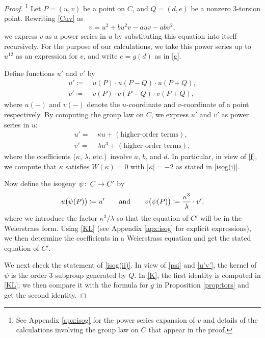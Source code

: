 \documentclass{gtpart}
\theoremstyle{definition}
\theoremstyle{remark}
\def\co{\colon\thinspace}
\newcommand{\ad}{{\rm and}}
\newcommand{\K}{\kappa}
\begin{document}
\begin{proof}
 \footnote{See Appendix \ref{apx:isog} for the power series expansion of 
 $v$ and details of the calculations involving the group law on $C$ that 
 appear in the proof.  }
 Let $P = (u,v)$ be a point on $C$, and $Q = (d,e)$ be a nonzero 
 3-torsion point.  Rewriting \eqref{Cuv} as 
 \[
  v = u^3 + b u^2 v - a u v - a b v^2, 
 \]
 we express $v$ as a power series in $u$ by substituting this equation 
 into itself recursively.  For the purpose of our calculations, we take 
 this power series up to $u^{12}$ as an expression for $v$, and write 
 $e = g(d)$ as in \eqref{g}.  

 Define functions $u'$ and $v'$ by 
 \begin{equation}
 \label{u'v'}
 \begin{split}
  u' \coloneqq & ~ u(P) \cdot u(P-Q) \cdot u(P+Q), \\
  v' \coloneqq & ~ v(P) \cdot v(P-Q) \cdot v(P+Q), 
 \end{split}
 \end{equation}
 where $u(-)$ and $v(-)$ denote the $u$-coordinate and $v$-coordinate of 
 a point respectively.  By computing the group law on $C$, we express 
 $u'$ and $v'$ as power series in $u$: 
 \begin{equation}
 \label{KL}
 \begin{split}
  u' = & ~ \K u + (\text{higher-order terms}), \\
  v' = & ~ \lambda u^3 + (\text{higher-order terms}), 
 \end{split}
 \end{equation}
 where the coefficients ($\K$, $\lambda$, etc.)~involve $a$, $b$, and 
 $d$.  In particular, in view of \eqref{f}, we compute that $\K$ 
 satisfies $W(\K) = 0$ with $|\K| = -2$ as stated in \eqref{isog(i)}.  

 Now define the isogeny $\psi \co C \to C'$ by 
 \begin{equation}
 \label{psi}
  u\big( \psi(P) \big) \coloneqq u' \qquad \ad \qquad v\big( \psi(P) \big) \coloneqq \frac{\K^3}{\lambda} \cdot v', 
 \end{equation}
 where we introduce the factor $\K^3 / \lambda$ so that the equation of 
 $C'$ will be in the Weierstrass form.  Using \eqref{KL} (see Appendix 
 \ref{apx:isog} for explicit expressions), we then determine the 
 coefficients in a Weierstrass equation and get the stated equation of 
 $C'$.  

 We next check the statement of \eqref{isog(ii)}.  In view of 
 \eqref{psi} and \eqref{u'v'}, the kernel of $\psi$ is the order-3 
 subgroup generated by $Q$.  In \eqref{K}, the first identity is 
 computed in \eqref{KL}; we then compare it with the formula for $g$ in 
 Proposition \ref{prop:tors} and get the second identity.  


\end{proof}
\end{document}
